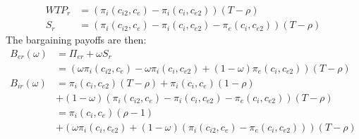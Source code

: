 \documentclass[12pt]{report}
\numberwithin{equation}{section}
\begin{document}
\begin{align*}
WTP_r &= (\pi_{i}(c_{i2},c_{e})-\pi_{i}(c_{i},c_{e2})) \left( T- \rho \right) \\
S_r &= (\pi_{i}(c_{i2},c_{e})-\pi_{i}(c_{i},c_{e2})-\pi_{e}(c_{i},c_{e2})) \left( T - \rho \right)
\end{align*}
The bargaining payoffs are then:
\begin{align*}
B_{er}(\omega) &= \Pi_{er}+\omega S_r \\
&= \left(\omega\pi_{i}(c_{i2},c_{e})-\omega \pi_{i}(c_{i},c_{e2})+(1-\omega)\pi_{e}(c_{i},c_{e2}) \right) \left( T - \rho \right) \\
B_{ir}(\omega) &=\pi_{i}(c_i,c_{e2}) \left( T - \rho \right)
+\pi_i(c_i,c_e) (1-\rho)
\\ &+(1-\omega)(\pi_{i}(c_{i2},c_{e})-\pi_{i}(c_{i},c_{e2})-\pi_{e}(c_{i},c_{e2})) \left( T- \rho \right) \\
&=\pi_i(c_i,c_e) (\rho-1)
\\ &+(\omega \pi_i(c_i,c_{e2})+(1-\omega)(\pi_{i}(c_{i2},c_{e})-\pi_{e}(c_{i},c_{e2}))) \left( T - \rho \right)
\end{align*}

\end{document}
